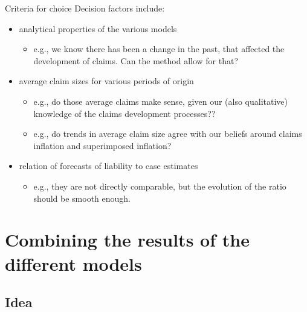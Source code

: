 \documentclass[
  ignorenonframetext,
  t,handout]{beamer}
\providecommand{\tightlist}{%
  \setlength{\itemsep}{0pt}\setlength{\parskip}{0pt}}
\begin{document}
\begin{frame}{Criteria for choice}
Decision factors include:

\begin{itemize}
\tightlist
\item
  analytical properties of the various models

  \begin{itemize}
  \tightlist
  \item
    e.g., we know there has been a change in the past, that affected the
    development of claims. Can the method allow for that?
  \end{itemize}
\item
  average claim sizes for various periods of origin

  \begin{itemize}
  \tightlist
  \item
    e.g., do those average claims make sense, given our (also
    qualitative) knowledge of the claims development processes??
  \item
    e.g., do trends in average claim size agree with our beliefs around
    claims inflation and superimposed inflation?
  \end{itemize}
\item
  relation of forecasts of liability to case estimates

  \begin{itemize}
  \tightlist
  \item
    e.g., they are not directly comparable, but the evolution of the
    ratio should be smooth enough.
  \end{itemize}
\end{itemize}
\end{frame}

\section{Combining the results of the different
models}\label{combining-the-results-of-the-different-models}

\subsection{Idea}\label{idea}
\end{document}
